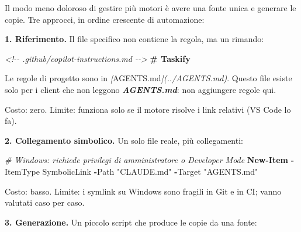 \documentclass[
  italian,
  10pt,
]{book}
\newenvironment{Shaded}{\begin{snugshade}}{\end{snugshade}}
\newcommand{\CommentTok}[1]{\textcolor[rgb]{0.56,0.35,0.01}{\textit{#1}}}
\newcommand{\FunctionTok}[1]{\textcolor[rgb]{0.13,0.29,0.53}{\textbf{#1}}}
\newcommand{\InformationTok}[1]{\textcolor[rgb]{0.56,0.35,0.01}{\textbf{\textit{#1}}}}
\newcommand{\NormalTok}[1]{#1}
\newcommand{\OperatorTok}[1]{\textcolor[rgb]{0.81,0.36,0.00}{\textbf{#1}}}
\newcommand{\OtherTok}[1]{\textcolor[rgb]{0.56,0.35,0.01}{#1}}
\newcommand{\StringTok}[1]{\textcolor[rgb]{0.31,0.60,0.02}{#1}}
\begin{document}
Il modo meno doloroso di gestire più motori è avere una fonte unica e
generare le copie. Tre approcci, in ordine crescente di automazione:

\textbf{1. Riferimento.} Il file specifico non contiene la regola, ma un
rimando:

\begin{Shaded}
\begin{Highlighting}[]
\CommentTok{\textless{}!{-}{-} .github/copilot{-}instructions.md {-}{-}\textgreater{}}
\FunctionTok{\# Taskify}

\NormalTok{Le regole di progetto sono in }\CommentTok{[}\OtherTok{\textasciigrave{}AGENTS.md\textasciigrave{}}\CommentTok{](../AGENTS.md)}\NormalTok{. Questo file esiste solo}
\NormalTok{per i client che non leggono }\InformationTok{\textasciigrave{}AGENTS.md\textasciigrave{}}\NormalTok{: non aggiungere regole qui.}
\end{Highlighting}
\end{Shaded}

Costo: zero. Limite: funziona solo se il motore risolve i link relativi
(VS Code lo fa).

\textbf{2. Collegamento simbolico.} Un solo file reale, più
collegamenti:

\begin{Shaded}
\begin{Highlighting}[]
\CommentTok{\# Windows: richiede privilegi di amministratore o Developer Mode}
\FunctionTok{New{-}Item} \OperatorTok{{-}}\NormalTok{ItemType SymbolicLink }\OperatorTok{{-}}\NormalTok{Path }\StringTok{"CLAUDE.md"} \OperatorTok{{-}}\NormalTok{Target }\StringTok{"AGENTS.md"}
\end{Highlighting}
\end{Shaded}

Costo: basso. Limite: i symlink su Windows sono fragili in Git e in CI;
vanno valutati caso per caso.

\textbf{3. Generazione.} Un piccolo script che produce le copie da una
fonte:
\end{document}
